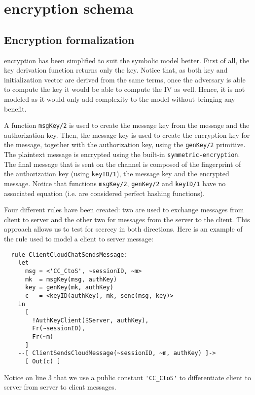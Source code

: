 \section{\Cchat{} encryption schema}
\label{sec:cloud-chat-formalization}

\subsection{Encryption formalization}
\Cchat{} encryption has been simplified to suit the symbolic model better.
First of all, the key derivation function returns only the key. Notice that, as both key and initialization vector are derived from the same terms, once the adversary is able to compute the key it would be able to compute the IV as well. Hence, it is not modeled as it would only add complexity to the model without bringing any benefit.

A function \lstinline{msgKey/2} is used to create the message key from the message and the authorization key. Then, the message key is used to create the encryption key for the message, together with the authorization key, using the \lstinline{genKey/2} primitive. The plaintext message is encrypted using the built-in \lstinline{symmetric-encryption}. The final message that is sent on the channel is composed of the fingerprint of the authorization key (using \lstinline{keyID/1}), the message key and the encrypted message. Notice that functions \lstinline{msgKey/2}, \lstinline{genKey/2} and \lstinline{keyID/1} have no associated equation (i.e. are considered perfect hashing functions).

Four different rules have been created: two are used to exchange messages from client to server and the other two for messages from the server to the client. This approach allows us to test for secrecy in both directions. Here is an example of the rule used to model a client to server message:

\begin{lstlisting}
  rule ClientCloudChatSendsMessage:
    let
      msg = <'CC_CtoS', ~sessionID, ~m>
      mk  = msgKey(msg, authKey)
      key = genKey(mk, authKey)
      c   = <keyID(authKey), mk, senc(msg, key)>
    in
      [
        !AuthKeyClient($Server, authKey),
        Fr(~sessionID),
        Fr(~m)
      ]
    --[ ClientSendsCloudMessage(~sessionID, ~m, authKey) ]->
      [ Out(c) ]
\end{lstlisting}

Notice on line 3 that we use a public constant \lstinline{'CC_CtoS'} to differentiate client to server from server to client messages.

